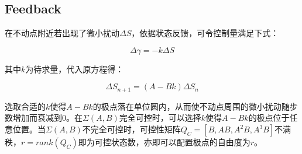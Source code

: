 \documentclass[UTF8]{ctexart}
\begin{document}
\subsection{Feedback}
在不动点附近若出现了微小扰动$\Delta S$，依据状态反馈，可令控制量满足下式：\par
\begin{equation}
\Delta\gamma = -k\Delta S
\end{equation}
\par
其中$k$为待求量，代入原方程得：\par
\begin{equation}
\Delta S_{n+1}=(A-Bk)\Delta S_{n}
\end{equation}
\par
选取合适的$k$使得$A-Bk$的极点落在单位圆内，从而使不动点周围的微小扰动随步数增加而衰减到0。在$\Sigma(A,B)$完全可控时，可以选择$k$使得$A-Bk$的极点位于任意位置。当$\Sigma(A,B)$不完全可控时，可控性矩阵$Q_{C}=[B,AB,A^{2}B,A^{3}B]$不满秩，$r=rank(Q_{C})$即为可控状态数，亦即可以配置极点的自由度为$r$。\par
\end{document}
